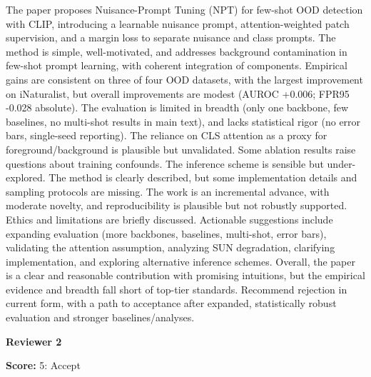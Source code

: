 \begin{tcolorbox}[
    colback=white,
    colframe=black!70,
    title=Reviewer Comments,
    breakable=true,
    fonttitle=\bfseries
]
The paper proposes Nuisance-Prompt Tuning (NPT) for few-shot OOD detection with CLIP, introducing a learnable nuisance prompt, attention-weighted patch supervision, and a margin loss to separate nuisance and class prompts. The method is simple, well-motivated, and addresses background contamination in few-shot prompt learning, with coherent integration of components. Empirical gains are consistent on three of four OOD datasets, with the largest improvement on iNaturalist, but overall improvements are modest (AUROC +0.006; FPR95 -0.028 absolute). The evaluation is limited in breadth (only one backbone, few baselines, no multi-shot results in main text), and lacks statistical rigor (no error bars, single-seed reporting). The reliance on CLS attention as a proxy for foreground/background is plausible but unvalidated. Some ablation results raise questions about training confounds. The inference scheme is sensible but under-explored. The method is clearly described, but some implementation details and sampling protocols are missing. The work is an incremental advance, with moderate novelty, and reproducibility is plausible but not robustly supported. Ethics and limitations are briefly discussed. Actionable suggestions include expanding evaluation (more backbones, baselines, multi-shot, error bars), validating the attention assumption, analyzing SUN degradation, clarifying implementation, and exploring alternative inference schemes. Overall, the paper is a clear and reasonable contribution with promising intuitions, but the empirical evidence and breadth fall short of top-tier standards. Recommend rejection in current form, with a path to acceptance after expanded, statistically robust evaluation and stronger baselines/analyses.

\end{tcolorbox}



\textbf{Reviewer 2}
\begin{tcolorbox}[
    colback=gray!5,
    colframe=gray!60,
    title=Review Score,
    fonttitle=\bfseries
]
\textbf{Score:} 5: Accept
\end{tcolorbox}


